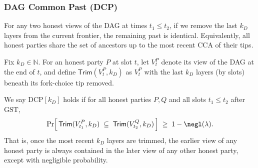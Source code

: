 \subsubsection{DAG Common Past (DCP)}
\label{app:DCP}

For any two honest views of the DAG at times $t_1\le t_2$, if we remove the last $k_D$ layers from the current frontier, the remaining past is identical. Equivalently, all honest parties share the set of ancestors up to the most recent CCA of their tips.

\begin{definition}\label{appdef:DCP}
Fix $k_D \in \mathbb{N}$. For an honest party $P$ at slot $t$, let $V_t^P$ denote
its view of the DAG at the end of $t$, and define
$\mathsf{Trim}(V_t^P,k_D)$ as $V_t^P$ with the last $k_D$ layers (by slots)
beneath its fork-choice tip removed.

We say $\mathrm{DCP}[k_D]$ holds if for all honest parties $P,Q$ and all slots
$t_1 \le t_2$ after $\mathrm{GST}$,
\[
\Pr\!\Big[\, \mathsf{Trim}(V_{t_1}^P,k_D)\;\subseteq\;\mathsf{Trim}(V_{t_2}^Q,k_D)\,\Big]
\;\ge\; 1-\negl(\lambda).
\]
That is, once the most recent $k_D$ layers are trimmed, the earlier view of
any honest party is always contained in the later view of any other honest party,
except with negligible probability.
\end{definition}



